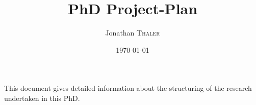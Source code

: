 \documentclass{article}
\title{PhD Project-Plan} %
\author{Jonathan \textsc{Thaler}} %
\date{\today} %
\begin{document}
\maketitle %

This document gives detailed information about the structuring of the research undertaken in this PhD.



\newpage



\newpage

%

\newpage



\end{document}
